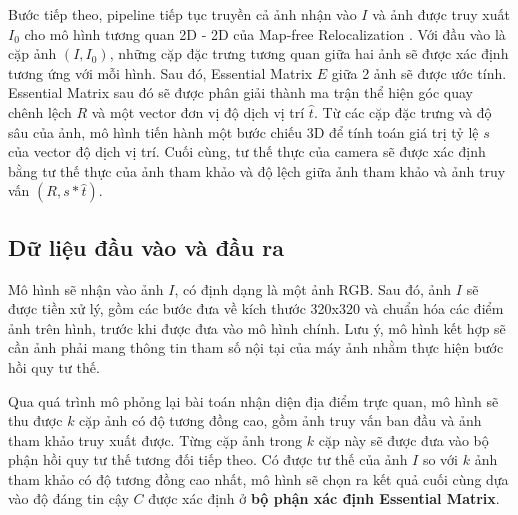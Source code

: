 Bước tiếp theo, pipeline tiếp tục truyền cả ảnh nhận vào $I$ và ảnh được truy xuất $I_0$ cho mô hình tương quan 2D - 2D của Map-free Relocalization \cite{arnold2022mapfree}. Với đầu vào là cặp ảnh $(I, I_0)$, những cặp đặc trưng tương quan giữa hai ảnh sẽ được xác định tương ứng với mỗi hình. Sau đó, Essential Matrix $E$ giữa 2 ảnh sẽ được ước tính. Essential Matrix sau đó sẽ được phân giải thành ma trận thể hiện góc quay chênh lệch $R$ và một vector đơn vị độ dịch vị trí $\hat{t}$. Từ các cặp đặc trưng và độ sâu của ảnh, mô hình tiến hành một bước chiếu 3D để tính toán giá trị tỷ lệ $s$ của vector độ dịch vị trí. Cuối cùng, tư thế thực của camera sẽ được xác định bằng tư thế thực của ảnh tham khảo và độ lệch giữa ảnh tham khảo và ảnh truy vấn $(R,s*\hat{t})$.

\subsection{Dữ liệu đầu vào và đầu ra}
Mô hình sẽ nhận vào ảnh $I$, có định dạng là một ảnh RGB. Sau đó, ảnh $I$ sẽ được tiền xử lý, gồm các bước đưa về kích thước 320x320 và chuẩn hóa các điểm ảnh trên hình, trước khi được đưa vào mô hình chính. Lưu ý, mô hình kết hợp sẽ cần ảnh phải mang thông tin tham số nội tại của máy ảnh nhằm thực hiện bước hồi quy tư thế. 

Qua quá trình mô phỏng lại bài toán nhận diện địa điểm trực quan, mô hình sẽ thu được $k$ cặp ảnh có độ tương đồng cao, gồm ảnh truy vấn ban đầu và ảnh tham khảo truy xuất được. Từng cặp ảnh trong $k$ cặp này sẽ được đưa vào bộ phận hồi quy tư thế tương đối tiếp theo. Có được tư thế của ảnh $I$ so với $k$ ảnh tham khảo có độ tương đồng cao nhất, mô hình sẽ chọn ra kết quả cuối cùng dựa vào độ đáng tin cậy $C$ được xác định ở \textbf{bộ phận xác định Essential Matrix}.

